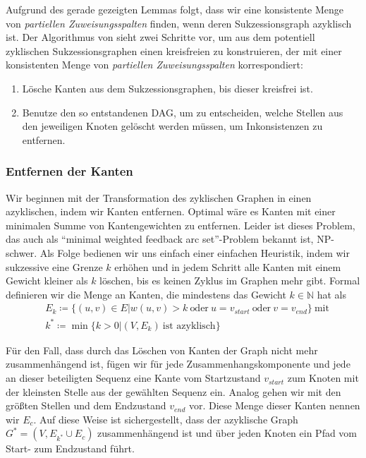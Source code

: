 Aufgrund des gerade gezeigten Lemmas folgt, dass wir eine konsistente Menge von \emph{partiellen Zuweisungsspalten} finden, wenn deren Sukzessionsgraph azyklisch ist. Der Algorithmus von \cite{pdc10} sieht zwei Schritte vor, um aus dem potentiell zyklischen Sukzessionsgraphen einen kreisfreien zu konstruieren, der mit einer konsistenten Menge von \emph{partiellen Zuweisungsspalten} korrespondiert:

\begin{enumerate}[topsep=0pt,itemsep=-1ex,partopsep=1ex,parsep=1ex]
	\item Lösche Kanten aus dem Sukzessionsgraphen, bis dieser kreisfrei ist.
	\item Benutze den so entstandenen DAG, um zu entscheiden, welche Stellen aus den jeweiligen Knoten gelöscht werden müssen, um Inkonsistenzen zu entfernen.
\end{enumerate}

\subsubsection{Entfernen der Kanten}

Wir beginnen mit der Transformation des zyklischen Graphen in einen azyklischen, indem wir Kanten entfernen. Optimal wäre es Kanten mit einer minimalen Summe von Kantengewichten zu entfernen. Leider ist dieses Problem, das auch als \enquote{minimal weighted feedback arc set}-Problem bekannt ist, NP-schwer. Als Folge bedienen wir uns einfach einer einfachen Heuristik, indem wir sukzessive eine Grenze $k$ erhöhen und in jedem Schritt alle Kanten mit einem Gewicht kleiner als $k$ löschen, bis es keinen Zyklus im Graphen mehr gibt. Formal definieren wir die Menge an Kanten, die mindestens das Gewicht $k\in \mathbb{N}$ hat als 
\begin{equation}
\begin{split}
	& E_k \coloneqq \{(u,v)\in E | w(u,v) > k\: \text{oder}\: u = v_{start}\: \text{oder}\: v = v_{end}\}\: \text{mit} \\
	& k^* \coloneqq \min\{k > 0 | (V,E_k)\: \text{ist azyklisch}\}
\end{split}
\end{equation}

Für den Fall, dass durch das Löschen von Kanten der Graph nicht mehr zusammenhängend ist, fügen wir für jede Zusammenhangskomponente und jede an dieser beteiligten Sequenz eine Kante vom Startzustand $v_{start}$ zum Knoten mit der kleinsten Stelle aus der gewählten Sequenz ein. Analog gehen wir mit den größten Stellen und dem Endzustand $v_{end}$ vor. Diese Menge dieser Kanten nennen wir $E_c$. Auf diese Weise ist sichergestellt, dass der azyklische Graph $G^* = (V,E_{k^*}\cup E_c)$ zusammenhängend ist und über jeden Knoten ein Pfad vom Start- zum Endzustand führt.

